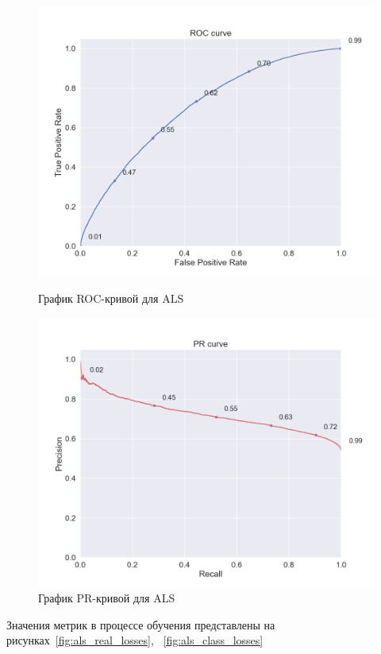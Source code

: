 \begin{figure}[h!]
\centering
\begin{minipage}{.5\textwidth}
\centering
\includegraphics[width=0.9\linewidth]{images/als/roc_curve}
\caption{График ROC-кривой для ALS}
\label{fig:als_roc}
\end{minipage}%
\begin{minipage}{.5\textwidth}
\centering
\includegraphics[width=0.9\linewidth]{images/als/pr_curve}
\caption{График PR-кривой для ALS}
\label{fig:als_pr}
\end{minipage}
\end{figure}

Значения метрик в процессе обучения представлены на рисунках~\ref{fig:als_real_losses}, ~\ref{fig:als_class_losses}

